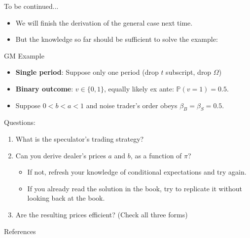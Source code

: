 \documentclass[english,10pt
,aspectratio=169
]{beamer}
\begin{document}
\begin{frame}{To be continued...}
	\begin{itemize}
		\item We will finish the derivation of the general case next time.
		\item But the knowledge so far should be sufficient to solve the example:
	\end{itemize}
	\begin{exampleblock}{GM Example}
		\begin{itemize}
			\item \textbf{Single period}: Suppose only one period (drop $t$ subscript, drop $\Omega$)
			\item \textbf{Binary outcome}: $v \in \{ 0, 1\}$, equally likely ex ante: $\mathbb{P}(v=1) = 0.5$.
			\item Suppose $0 < b < a < 1$ and noise trader's order obeys $\beta_B=\beta_S=0.5$. 
		\end{itemize}
		Questions:
		\begin{enumerate}
			\item What is the speculator's trading strategy?
			\item Can you derive dealer's \alert{prices $a$ and $b$}, as a function of $\pi$?
			\begin{itemize}
				\item If not, refresh your knowledge of conditional expectations and try again.
				\item If you already read the solution in the book, try to replicate it without looking back at the book.
			\end{itemize}
			\item Are the resulting prices efficient? (Check all three forms)
		\end{enumerate}
	\end{exampleblock}
\end{frame}



\appendix
\begin{frame}[allowframebreaks]{References}
	
	
\end{frame}
\end{document}
